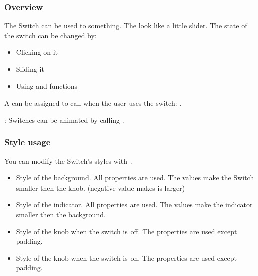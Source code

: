 \documentclass[letterpaper,10pt,english]{sphinxmanual}
\begin{document}
\subsubsection{Overview}
\label{\detokenize{object-types/sw:overview}}
The Switch can be used to   something. The look like a little slider. The state of the switch can be changed by:
\begin{itemize}
\item {} 
Clicking on it

\item {} 
Sliding it

\item {} 
Using  and  functions

\end{itemize}

A  can be assigned to call when the user uses the switch: .

: Switches can be animated by calling .


\subsubsection{Style usage}
\label{\detokenize{object-types/sw:style-usage}}
You can modify the Switch’s styles with .
\begin{itemize}
\item {} 
 Style of the background. All  properties are used. The  values make the Switch smaller then the knob. (negative value makes is larger)

\item {} 
 Style of the indicator. All  properties are used. The  values make the indicator smaller then the background.

\item {} 
 Style of the knob when the switch is off.  The  properties are used except padding.

\item {} 
 Style of the knob when the switch is on.  The  properties are used except padding.

\end{itemize}
\end{document}
